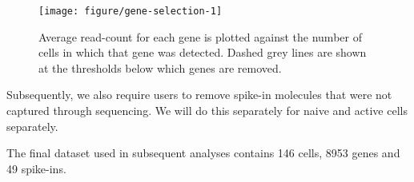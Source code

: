\documentclass[9pt,a4paper,]{extarticle}
\newenvironment{Shaded}{\begin{snugshade}}{\end{snugshade}}
\newcommand{\CommentTok}[1]{\textcolor[rgb]{0.56,0.35,0.01}{\textit{#1}}}
\newcommand{\DecValTok}[1]{\textcolor[rgb]{0.00,0.00,0.81}{#1}}
\newcommand{\KeywordTok}[1]{\textcolor[rgb]{0.13,0.29,0.53}{\textbf{#1}}}
\newcommand{\NormalTok}[1]{#1}
\newcommand{\OperatorTok}[1]{\textcolor[rgb]{0.81,0.36,0.00}{\textbf{#1}}}
\newcommand{\StringTok}[1]{\textcolor[rgb]{0.31,0.60,0.02}{#1}}
\begin{document}
\begin{figure}

{\centering \texttt{[image: figure/gene-selection-1]} 

}

\caption{Average read-count for each gene is plotted against the number of cells in which that gene was detected. Dashed grey lines are shown at the thresholds below which genes are removed.}\label{fig:gene-selection}
\end{figure}

\begin{Shaded}
\end{Shaded}

Subsequently, we also require users to remove spike-in molecules that were not
captured through sequencing. We will do this separately for naive and active
cells separately.

\begin{Shaded}
\end{Shaded}

The final dataset used in subsequent analyses contains
146 cells, 8953 genes and
49 spike-ins.
\end{document}
